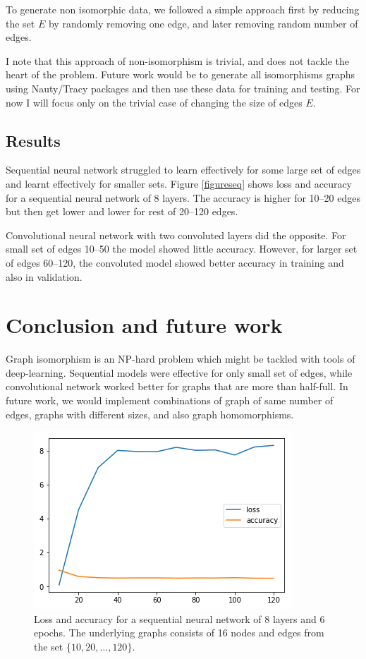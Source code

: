 \documentclass[letterpaper,UKenglish]{lipics-v2018}
\begin{document}

To generate non isomorphic data, we followed a simple approach first by reducing the set $E$ by randomly removing one edge, and later removing random number of edges. 

I note that this approach of non-isomorphism is trivial, and does not tackle the heart of the problem. Future work would be to generate all isomorphisms graphs using Nauty/Tracy packages and then use these data for training and testing. For now I will focus only on the trivial case of changing the size of edges $E$.

\subsection{Results}
Sequential neural network struggled to learn effectively for some large set of edges and learnt effectively for smaller sets. Figure \ref{figureseq} shows loss and accuracy for a sequential neural network of 8 layers. The accuracy is higher for 10--20 edges but then get lower and lower for rest of 20--120 edges.

Convolutional neural network with two convoluted layers did the opposite. For small set of edges 10--50 the model showed little accuracy. However, for larger set of edges 60--120, the convoluted model showed better accuracy in training and also in validation. 

\section{Conclusion and future work}
Graph isomorphism is an NP-hard problem which might be tackled with tools of deep-learning. Sequential models were effective for only small set of edges, while convolutional network worked better for graphs that are more than half-full. In future work, we would implement combinations of graph of same number of edges, graphs with different sizes, and also graph homomorphisms.

\begin{figure}\label{figseq}
\centering
\includegraphics[scale = .5]{pic/8-layers-sequential}
\caption{Loss and accuracy for a sequential neural network of 8 layers and 6 epochs. The underlying graphs consists of 16 nodes and edges from the set $\{10,20, \dots, 120 \}$.}
\end{figure}
\end{document}

